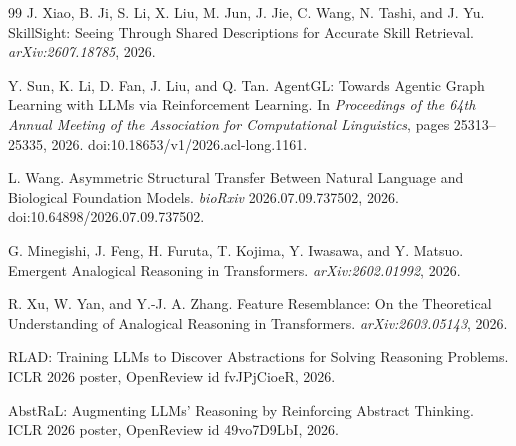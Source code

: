\begin{thebibliography}{99}
J. Xiao, B. Ji, S. Li, X. Liu, M. Jun, J. Jie, C. Wang, N. Tashi, and J. Yu. SkillSight: Seeing Through Shared Descriptions for Accurate Skill Retrieval. \emph{arXiv:2607.18785}, 2026.

Y. Sun, K. Li, D. Fan, J. Liu, and Q. Tan. AgentGL: Towards Agentic Graph Learning with LLMs via Reinforcement Learning. In \emph{Proceedings of the 64th Annual Meeting of the Association for Computational Linguistics}, pages 25313--25335, 2026. doi:10.18653/v1/2026.acl-long.1161.

L. Wang. Asymmetric Structural Transfer Between Natural Language and Biological Foundation Models. \emph{bioRxiv} 2026.07.09.737502, 2026. doi:10.64898/2026.07.09.737502.

G. Minegishi, J. Feng, H. Furuta, T. Kojima, Y. Iwasawa, and Y. Matsuo. Emergent Analogical Reasoning in Transformers. \emph{arXiv:2602.01992}, 2026.

R. Xu, W. Yan, and Y.-J. A. Zhang. Feature Resemblance: On the Theoretical Understanding of Analogical Reasoning in Transformers. \emph{arXiv:2603.05143}, 2026.

RLAD: Training LLMs to Discover Abstractions for Solving Reasoning Problems. ICLR 2026 poster, OpenReview id fvJPjCioeR, 2026.

AbstRaL: Augmenting LLMs' Reasoning by Reinforcing Abstract Thinking. ICLR 2026 poster, OpenReview id 49vo7D9LbI, 2026.

\end{thebibliography}
